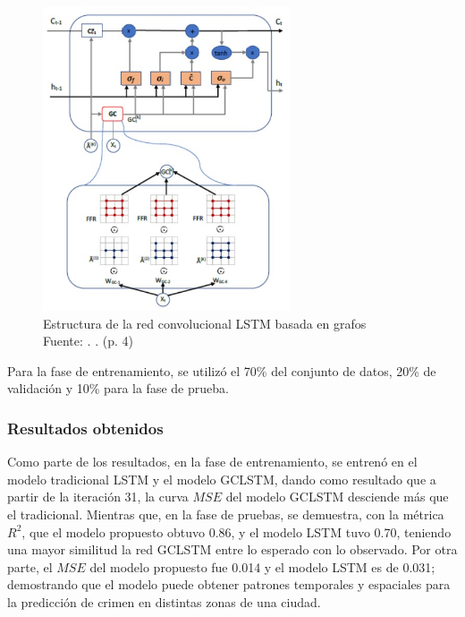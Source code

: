 
\begin{figure}[h]
	\begin{center}
		\includegraphics[width=0.65\textwidth]{2/figures/EsquivelRed.jpg}
		\caption{Estructura de la red convolucional LSTM basada en grafos \\
			Fuente: \citep*{pr_esquivel}. . (p. 4)}
		\label{1:fig2}
	\end{center}
\end{figure}

Para la fase de entrenamiento, se utilizó el 70\% del conjunto de datos, 20\% de validación y 10\% para la fase de prueba.

\subsubsection{Resultados obtenidos}
Como parte de los resultados, en la fase de entrenamiento, se entrenó en el modelo tradicional LSTM y el modelo GCLSTM, dando como resultado que a partir de la iteración 31, la curva $MSE$ del modelo GCLSTM desciende más que el tradicional. 
Mientras que, en la fase de pruebas, se demuestra, con la métrica $R^{2}$, que el modelo propuesto obtuvo 0.86, y el modelo LSTM tuvo 0.70, teniendo una mayor similitud la red GCLSTM entre lo esperado con lo observado. Por otra parte, el $MSE$ del modelo propuesto fue 0.014 y el modelo LSTM es de 0.031; demostrando que el modelo puede obtener patrones temporales y espaciales para la predicción de crimen en distintas zonas de una ciudad. 

